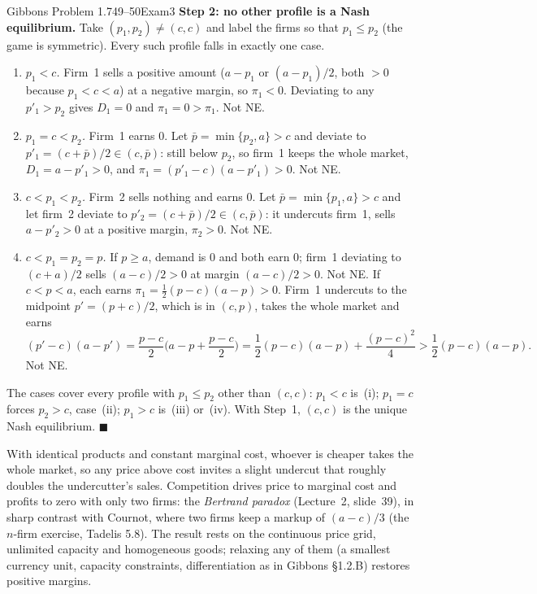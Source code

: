 \begin{exsol}{Gibbons Problem 1.7}{49--50}{Exam}{3}
\textbf{Step 2: no other profile is a Nash equilibrium.} Take $(p_1, p_2) \ne (c, c)$ and label the
firms so that $p_1 \le p_2$ (the game is symmetric). Every such profile falls in exactly one case.
\begin{enumerate}[label=(\roman*)]
  \item \emph{$p_1 < c$.} Firm~1 sells a positive amount ($a - p_1$ or $(a-p_1)/2$, both $> 0$
  because $p_1 < c < a$) at a negative margin, so $\pi_1 < 0$. Deviating to any $p'_1 > p_2$ gives
  $D_1 = 0$ and $\pi_1 = 0 > \pi_1$. Not NE.
  \item \emph{$p_1 = c < p_2$.} Firm~1 earns $0$. Let $\bar p = \min\{p_2, a\} > c$ and deviate to
  $p'_1 = (c + \bar p)/2 \in (c, \bar p)$: still below $p_2$, so firm~1 keeps the whole market,
  $D_1 = a - p'_1 > 0$, and $\pi_1 = (p'_1 - c)(a - p'_1) > 0$. Not NE.
  \item \emph{$c < p_1 < p_2$.} Firm~2 sells nothing and earns $0$. Let
  $\bar p = \min\{p_1, a\} > c$ and let firm~2 deviate to $p'_2 = (c + \bar p)/2 \in (c, \bar p)$:
  it undercuts firm~1, sells $a - p'_2 > 0$ at a positive margin, $\pi_2 > 0$. Not NE.
  \item \emph{$c < p_1 = p_2 = p$.} If $p \ge a$, demand is $0$ and both earn $0$; firm~1 deviating
  to $(c + a)/2$ sells $(a - c)/2 > 0$ at margin $(a-c)/2 > 0$. Not NE. If $c < p < a$, each earns
  $\pi_1 = \tfrac12 (p - c)(a - p) > 0$. Firm~1 undercuts to the midpoint $p' = (p + c)/2$, which is
  in $(c, p)$, takes the whole market and earns
  \[
    (p' - c)(a - p') = \frac{p - c}{2}\Big(a - p + \frac{p - c}{2}\Big)
    = \frac12 (p - c)(a - p) + \frac{(p - c)^2}{4} > \frac12 (p - c)(a - p).
  \]
  Not NE.
\end{enumerate}
The cases cover every profile with $p_1 \le p_2$ other than $(c,c)$: $p_1 < c$ is~(i); $p_1 = c$
forces $p_2 > c$, case~(ii); $p_1 > c$ is~(iii) or~(iv). With Step~1, $(c, c)$ is the unique Nash
equilibrium. $\blacksquare$

\interp With identical products and constant marginal cost, whoever is cheaper takes the whole
market, so any price above cost invites a slight undercut that roughly doubles the undercutter's
sales. Competition drives price to marginal cost and profits to zero with only two firms: the
\emph{Bertrand paradox} (Lecture~2, slide~39), in sharp contrast with Cournot, where two firms keep
a markup of $(a-c)/3$ (the $n$-firm exercise, Tadelis 5.8). The result rests on the continuous
price grid, unlimited capacity and homogeneous goods; relaxing any of them (a smallest currency
unit, capacity constraints, differentiation as in Gibbons \S1.2.B) restores positive margins.


\end{exsol}
